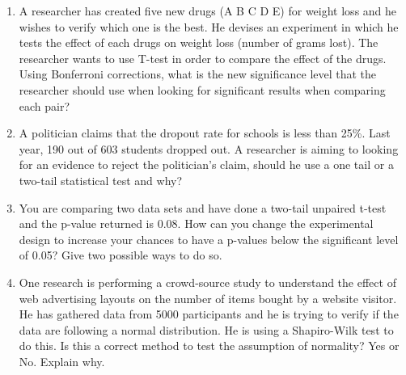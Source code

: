 \documentclass{article}
\newif\ifanswer
\begin{document}
\begin{enumerate}
\ifanswer
(Answer: False this is used for comparing non-parametric data, i.e. with a skewed distribution)
\fi

\item A researcher has created five new drugs (A B C D E) for weight loss and he wishes to verify which one is the best. He devises an experiment in which he tests the effect of each drugs on weight loss (number of grams lost). The researcher wants to use T-test in order to compare the effect of the drugs. Using Bonferroni corrections, what is the new significance level that the researcher should use when looking for significant results when comparing each pair?

\ifanswer
(Answer: 0.005/10 because there are 10 comparisons made)
\fi

\item A politician claims that the dropout rate for schools is less
  than 25\%. Last year, 190 out of 603 students dropped out. A
  researcher is aiming to looking for an evidence to reject the
  politician's claim, should he use a one tail or a two-tail
  statistical test and why?

\ifanswer
(Answer: one-tail is enough because the researcher is only interested in one direction. i.e. the dropout rate below 25\%. If the question was \lq{}equal to\rq{} we would use a two-tail test)
\fi

\item You are comparing two data sets and have done a two-tail
  unpaired t-test and the p-value returned is 0.08. How can you change
  the experimental design to increase your chances to have a p-values
  below the significant level of 0.05? Give two possible ways to do
  so.

\ifanswer  
(Answers possible: increase the sample size, used paired data (within subject experiment), design the experiment as one-tail)
\fi

\item One research is performing a crowd-source study to understand
  the effect of web advertising layouts on the number of items bought
  by a website visitor. He has gathered data from 5000 participants
  and he is trying to verify if the data are following a normal
  distribution. He is using a Shapiro-Wilk test to do this. Is this a
  correct method to test the assumption of normality? Yes or
  No. Explain why.

\ifanswer  
(Answer: False. Kolmogorov-Smirnov test is more appropriate for large sample size $N >50$ and Shapiro-Wilk for small sample size $N <=50$)
\fi


\end{enumerate}
\end{document}
